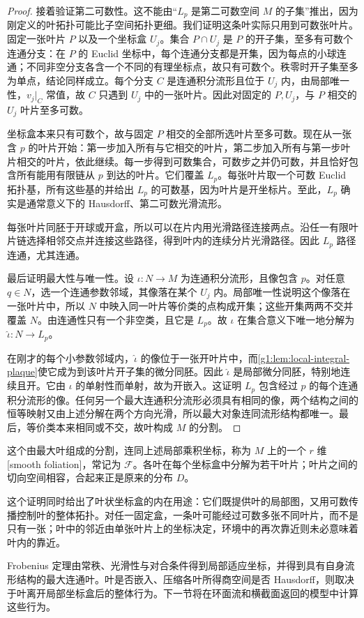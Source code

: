 \begin{proof}
	接着验证第二可数性。这不能由“\(L_p\) 是第二可数空间 \(M\) 的子集”推出，因为刚定义的叶拓扑可能比子空间拓扑更细。我们证明这条叶实际只用到可数张叶片。固定一张叶片 \(P\) 以及一个坐标盒 \(U_j\)。集合 \(P\cap U_j\) 是 \(P\) 的开子集，至多有可数个连通分支：在 \(P\) 的 Euclid 坐标中，每个连通分支都是开集，因为每点的小球连通；不同非空分支各含一个不同的有理坐标点，故只有可数个。秩零时开子集至多为单点，结论同样成立。每个分支 \(C\) 是连通积分流形且位于 \(U_j\) 内，由局部唯一性，\(v_j|_C\) 常值，故 \(C\) 只遇到 \(U_j\) 中的一张叶片。因此对固定的 \(P,U_j\)，与 \(P\) 相交的 \(U_j\) 叶片至多可数。

	坐标盒本来只有可数个，故与固定 \(P\) 相交的全部所选叶片至多可数。现在从一张含 \(p\) 的叶片开始：第一步加入所有与它相交的叶片，第二步加入所有与第一步叶片相交的叶片，依此继续。每一步得到可数集合，可数步之并仍可数，并且恰好包含所有能用有限链从 \(p\) 到达的叶片。它们覆盖 \(L_p\)。每张叶片取一个可数 Euclid 拓扑基，所有这些基的并给出 \(L_p\) 的可数基，因为叶片是开坐标片。至此，\(L_p\) 确实是通常意义下的 Hausdorff、第二可数光滑流形。

	每张叶片同胚于开球或开盒，所以可以在片内用光滑路径连接两点。沿任一有限叶片链选择相邻交点并连接这些路径，得到叶内的连续分片光滑路径。因此 \(L_p\) 路径连通，尤其连通。

	最后证明最大性与唯一性。设 \(\iota:N\to M\) 为连通积分流形，且像包含 \(p\)。对任意 \(q\in N\)，选一个连通参数邻域，其像落在某个 \(U_j\) 内。局部唯一性说明这个像落在一张叶片中，所以 \(N\) 中映入同一叶片等价类的点构成开集；这些开集两两不交并覆盖 \(N\)。由连通性只有一个非空类，且它是 \(L_p\)。故 \(\iota\) 在集合意义下唯一地分解为 \(\widehat\iota:N\to L_p\)。

	在刚才的每个小参数邻域内，\(\widehat\iota\) 的像位于一张开叶片中，而\cref{g1:lem:local-integral-plaque}使它成为到该叶片开子集的微分同胚。因此 \(\widehat\iota\) 是局部微分同胚，特别地连续且开。它由 \(\iota\) 的单射性而单射，故为开嵌入。这证明 \(L_p\) 包含经过 \(p\) 的每个连通积分流形的像。任何另一个最大连通积分流形必须具有相同的像，两个结构之间的恒等映射又由上述分解在两个方向光滑，所以最大对象连同流形结构都唯一。最后，等价类本来相同或不交，故叶构成 \(M\) 的分割。
\end{proof}

这个由最大叶组成的分割，连同上述局部乘积坐标，称为 \(M\) 上的一个 \(r\) 维[smooth foliation]，常记为 \(\mathcal F\)。各叶在每个坐标盒中分解为若干叶片；叶片之间的切向空间相容，合起来正是原来的分布 \(D\)。

\ProseParagraphBreak

这个证明同时给出了叶状坐标盒的内在用途：它们既提供叶的局部图，又用可数传播控制叶的整体拓扑。对任一固定盒，一条叶可能经过可数多张不同叶片，而不是只有一张；叶中的邻近由单张叶片上的坐标决定，环境中的再次靠近则未必意味着叶内的靠近。

\ProseParagraphBreak

Frobenius 定理由常秩、光滑性与对合条件得到局部适应坐标，并得到具有自身流形结构的最大连通叶。叶是否嵌入、压缩各叶所得商空间是否 Hausdorff，则取决于叶离开局部坐标盒后的整体行为。下一节将在环面流和横截面返回的模型中计算这些行为。

